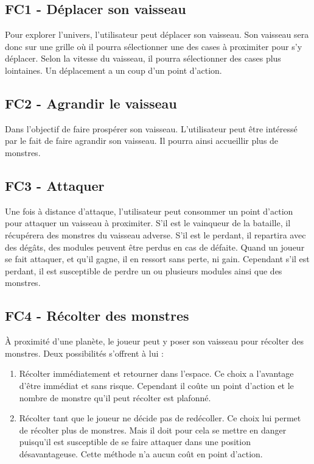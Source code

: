 \documentclass[a4paper,11pt]{report}
\begin{document}
        \subsection{FC1 - Déplacer son vaisseau}
            Pour explorer l'univers, l'utilisateur peut déplacer son vaisseau. Son vaisseau sera donc sur une grille où il pourra sélectionner une des cases à proximiter pour s'y déplacer. Selon la vitesse du vaisseau, il pourra sélectionner des cases plus lointaines. Un déplacement a un coup d'un point d'action.

        \subsection{FC2 - Agrandir le vaisseau}
            Dans l'objectif de faire prospérer son vaisseau. L'utilisateur peut être intéressé par le fait de faire agrandir son vaisseau. Il pourra ainsi accueillir plus de monstres.

        \subsection{FC3 - Attaquer}
            Une fois à distance d'attaque, l'utilisateur peut consommer un point d'action pour attaquer un vaisseau à proximiter. S'il est le vainqueur de la bataille, il récupérera des monstres du vaisseau adverse. S'il est le perdant, il repartira avec des dégâts, des modules peuvent être perdus en cas de défaite. Quand un joueur se fait attaquer, et qu'il gagne, il en ressort sans perte, ni gain. Cependant s'il est perdant, il est susceptible de perdre un ou plusieurs modules ainsi que des monstres.

        \subsection{FC4 - Récolter des monstres}
            À proximité d'une planète, le joueur peut y poser son vaisseau pour récolter des monstres. Deux possibilités s'offrent à lui :
            \begin{enumerate}
                \item Récolter immédiatement et retourner dans l'espace. Ce choix a l'avantage d'être immédiat et sans risque. Cependant il coûte un point d'action et le nombre de monstre qu'il peut récolter est plafonné.
                \item Récolter tant que le joueur ne décide pas de redécoller. Ce choix lui permet de récolter plus de monstres. Mais il doit pour cela se mettre en danger puisqu'il est susceptible de se faire attaquer dans une position désavantageuse. Cette méthode n'a aucun coût en point d'action.
            \end{enumerate}
\end{document}
